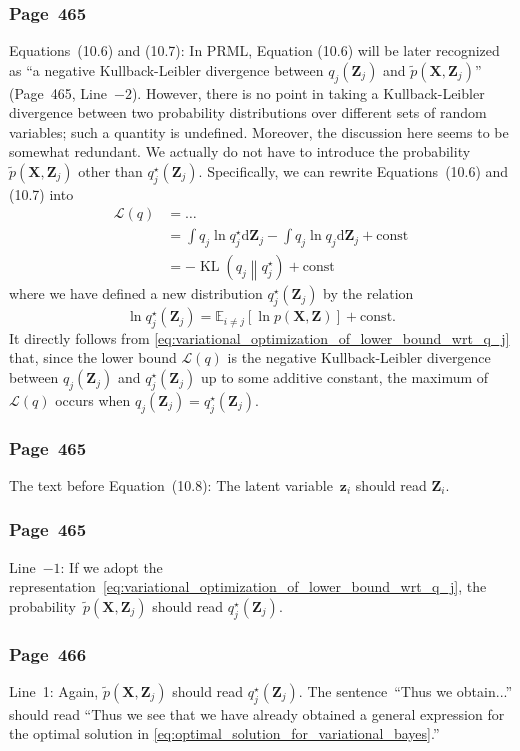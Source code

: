 \documentclass[12pt,a4paper]{article}
\newcommand{\erratum}[1]{\subsubsection*{#1}}
\begin{document}
\erratum{Page~465}
Equations~(10.6) and (10.7):
In PRML, Equation (10.6) will be later recognized as ``a negative Kullback-Leibler divergence
between $q_j(\mathbf{Z}_j)$ and $\tilde{p}(\mathbf{X}, \mathbf{Z}_j)$''
(Page~465, Line~$-2$).
However, there is no point in taking a Kullback-Leibler divergence between two probability
distributions over different sets of random variables; such a quantity is undefined.
Moreover, the discussion here seems to be somewhat redundant.
We actually do not have to introduce
the probability~$\tilde{p}(\mathbf{X}, \mathbf{Z}_j)$ other than $q_j^{\star}(\mathbf{Z}_j)$.
Specifically, we can rewrite Equations~(10.6) and (10.7) into
\begin{align}
\mathcal{L}(q) &= \dots \\
&= \int q_j \ln q_j^{\star} \mathrm{d}\mathbf{Z}_j - \int q_j \ln q_j \mathrm{d}\mathbf{Z}_j
 + \text{const} \\
&= - \operatorname{KL}\left( q_j \middle\| q_j^{\star} \right) + \text{const}
\label{eq:variational_optimization_of_lower_bound_wrt_q_j}
\end{align}
where we have defined a new distribution $q_j^{\star}\left(\mathbf{Z}_j\right)$ by the relation
\begin{equation}
\ln q_j^{\star}\left(\mathbf{Z}_j\right) =
\mathbb{E}_{i \neq j}\left[ \ln p\left(\mathbf{X}, \mathbf{Z}\right) \right] + \text{const}.
\label{eq:optimal_solution_for_variational_bayes}
\end{equation}
It directly follows from \eqref{eq:variational_optimization_of_lower_bound_wrt_q_j} that,
since the lower bound $\mathcal{L}(q)$ is the negative Kullback-Leibler divergence between
$q_j(\mathbf{Z}_j)$ and $q_j^{\star}(\mathbf{Z}_j)$ up to some additive constant,
the maximum of $\mathcal{L}(q)$ occurs when $q_j(\mathbf{Z}_j) = q_j^{\star}(\mathbf{Z}_j)$.

\erratum{Page~465}
The text before Equation~(10.8):
The latent variable~$\mathbf{z}_i$ should read $\mathbf{Z}_i$.

\erratum{Page~465}
Line~$-1$:
If we adopt the representation~\eqref{eq:variational_optimization_of_lower_bound_wrt_q_j},
the probability~$\tilde{p}(\mathbf{X}, \mathbf{Z}_j)$ should read
$q_j^{\star}\left(\mathbf{Z}_j\right)$.

\erratum{Page~466}
Line~1:
Again, $\tilde{p}(\mathbf{X}, \mathbf{Z}_j)$ should read
$q_j^{\star}\left(\mathbf{Z}_j\right)$.
The sentence~``Thus we obtain...'' should read
``Thus we see that we have already obtained a general expression for the optimal solution in
\eqref{eq:optimal_solution_for_variational_bayes}.''
\end{document}
